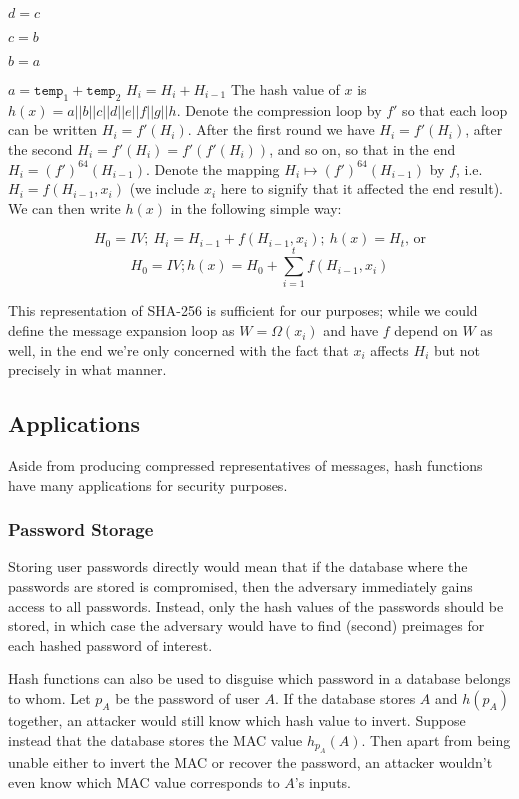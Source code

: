 \documentclass[a4paper,12pt]{article}
\begin{document}
\indent \indent $d = c$

\indent \indent $c=b$

\indent \indent $b=a$

\indent \indent $a = \texttt{temp}_1+\texttt{temp}_2$
\newline
\newline
\indent $H_i = H_i+H_{i-1}$
\newline
\newline
\noindent
The hash value of $x$ is $h(x) = a||b||c||d||e||f||g||h$. Denote the compression loop by $f'$ so that each loop can be written $H_i = f'(H_i)$. After the first round we have $H_i = f'(H_i)$, after the second $H_i = f'(H_i) = f'(f'(H_i))$, and so on, so that in the end $H_i = (f')^{64}(H_{i-1})$. Denote the mapping $H_i \mapsto (f')^{64}(H_{i-1})$ by $f$, i.e. $H_i = f(H_{i-1},x_i)$ (we include $x_i$ here to signify that it affected the end result). We can then write $h(x)$ in the following simple way:

$$H_0 = IV;\ H_i = H_{i-1}+f(H_{i-1},x_i);\ h(x) = H_t \text{, or}$$
$$H_0 = IV; h(x) = H_0+\sum_{i=1}^t f(H_{i-1},x_i)$$


\noindent
This representation of SHA-256 is sufficient for our purposes; while we could define the message expansion loop as $W = \Omega(x_i)$ and have $f$ depend on $W$ as well, in the end we're only concerned with the fact that $x_i$ affects $H_i$ but not precisely in what manner.

\subsection{Applications}

Aside from producing compressed representatives of messages, hash functions have many applications for security purposes.

\subsubsection{Password Storage}

Storing user passwords directly would mean that if the database where the passwords are stored is compromised, then the adversary immediately gains access to all passwords. Instead, only the hash values of the passwords should be stored, in which case the adversary would have to find (second) preimages for each hashed password of interest. \cite[p. 389]{menezes}

Hash functions can also be used to disguise which password in a database belongs to whom. Let $p_A$ be the password of user $A$. If the database stores $A$ and $h(p_A)$ together, an attacker would still know which hash value to invert. Suppose instead that the database stores the MAC value $h_{p_A}(A)$. Then apart from being unable either to invert the MAC or recover the password, an attacker wouldn't even know which MAC value corresponds to $A$'s inputs.
\end{document}
